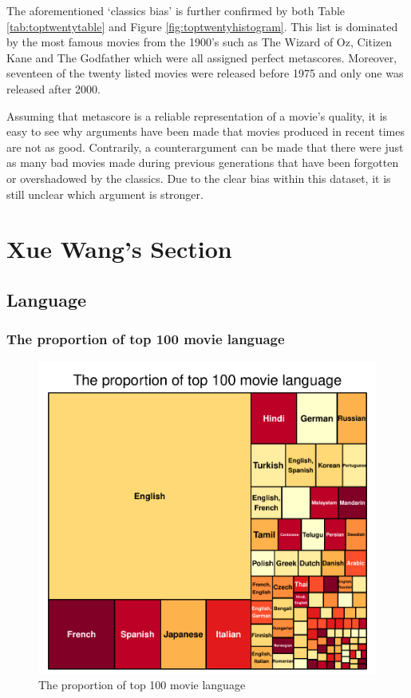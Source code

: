 \documentclass[11pt,a4paper,]{article}
\begin{document}
The aforementioned `classics bias' is further confirmed by both Table \ref{tab:toptwentytable} and Figure \ref{fig:toptwentyhistogram}. This list is dominated by the most famous movies from the 1900's such as The Wizard of Oz, Citizen Kane and The Godfather which were all assigned perfect metascores. Moreover, seventeen of the twenty listed movies were released before 1975 and only one was released after 2000.

Assuming that metascore is a reliable representation of a movie's quality, it is easy to see why arguments have been made that movies produced in recent times are not as good. Contrarily, a counterargument can be made that there were just as many bad movies made during previous generations that have been forgotten or overshadowed by the classics. Due to the clear bias within this dataset, it is still unclear which argument is stronger.

\newpage

\hypertarget{xue-wangs-section}{%
\section{Xue Wang's Section}\label{xue-wangs-section}}

\hypertarget{language}{%
\subsection{Language}\label{language}}

\hypertarget{the-proportion-of-top-100-movie-language}{%
\subsubsection{The proportion of top 100 movie language}\label{the-proportion-of-top-100-movie-language}}

\begin{figure}
\centering
\includegraphics{Report_files/figure-latex/language-1.pdf}
\caption{\label{fig:language}The proportion of top 100 movie language}
\end{figure}
\end{document}
